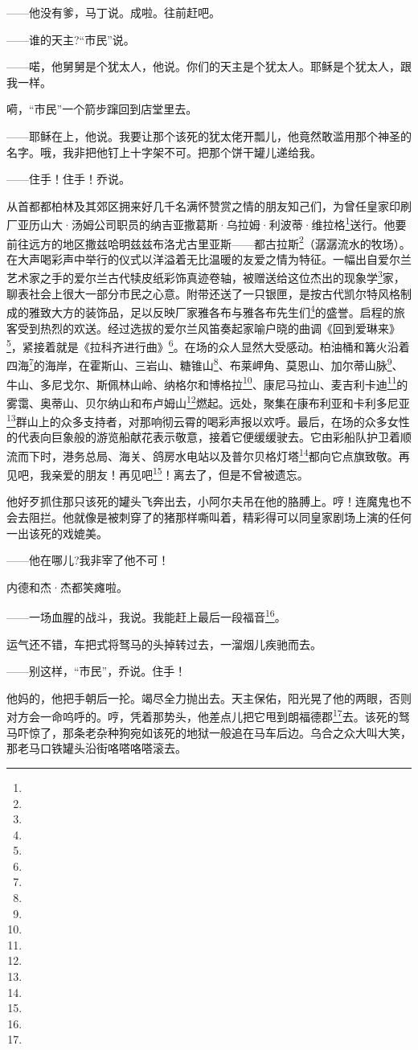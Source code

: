 \par ——他没有爹，马丁说。成啦。往前赶吧。
\par ——谁的天主?“市民”说。
\par ——喏，他舅舅是个犹太人，他说。你们的天主是个犹太人。耶稣是个犹太人，跟我一样。
\par 嗬，“市民”一个箭步蹿回到店堂里去。
\par ——耶稣在上，他说。我要让那个该死的犹太佬开瓢儿，他竟然敢滥用那个神圣的名字。哦，我非把他钉上十字架不可。把那个饼干罐儿递给我。
\par ——住手！住手！乔说。
\par 从首都都柏林及其郊区拥来好几千名满怀赞赏之情的朋友知己们，为曾任皇家印刷厂亚历山大·汤姆公司职员的纳吉亚撒葛斯·乌拉姆·利波蒂·维拉格\footnote{}送行。他要前往远方的地区撒兹哈明兹兹布洛尤古里亚斯——都古拉斯\footnote{}（潺潺流水的牧场）。在大声喝彩声中举行的仪式以洋溢着无比温暖的友爱之情为特征。一幅出自爱尔兰艺术家之手的爱尔兰古代犊皮纸彩饰真迹卷轴，被赠送给这位杰出的现象学\footnote{}家，聊表社会上很大一部分市民之心意。附带还送了一只银匣，是按古代凯尔特风格制成的雅致大方的装饰品，足以反映厂家雅各布与雅各布先生们\footnote{}的盛誉。启程的旅客受到热烈的欢送。经过选拔的爱尔兰风笛奏起家喻户晓的曲调《回到爱琳来》\footnote{}，紧接着就是《拉科齐进行曲》\footnote{}。在场的众人显然大受感动。柏油桶和篝火沿着四海\footnote{}的海岸，在霍斯山、三岩山、糖锥山\footnote{}、布莱岬角、莫恩山、加尔蒂山脉\footnote{}、牛山、多尼戈尔、斯佩林山岭、纳格尔和博格拉\footnote{}、康尼马拉山、麦吉利卡迪\footnote{}的雾霭、奥蒂山、贝尔纳山和布卢姆山\footnote{}燃起。远处，聚集在康布利亚和卡利多尼亚\footnote{}群山上的众多支持者，对那响彻云霄的喝彩声报以欢呼。最后，在场的众多女性的代表向巨象般的游览船献花表示敬意，接着它便缓缓驶去。它由彩船队护卫着顺流而下时，港务总局、海关、鸽房水电站以及普尔贝格灯塔\footnote{}都向它点旗致敬。再见吧，我亲爱的朋友！再见吧\footnote{}！离去了，但是不曾被遗忘。
\par 他好歹抓住那只该死的罐头飞奔出去，小阿尔夫吊在他的胳膊上。哼！连魔鬼也不会去阻拦。他就像是被刺穿了的猪那样嘶叫着，精彩得可以同皇家剧场上演的任何一出该死的戏媲美。
\par ——他在哪儿?我非宰了他不可！
\par 内德和杰·杰都笑瘫啦。
\par ——一场血腥的战斗，我说。我能赶上最后一段福音\footnote{}。
\par 运气还不错，车把式将驽马的头掉转过去，一溜烟儿疾驰而去。
\par ——别这样，“市民”，乔说。住手！
\par 他妈的，他把手朝后一抡。竭尽全力抛出去。天主保佑，阳光晃了他的两眼，否则对方会一命呜呼的。哼，凭着那势头，他差点儿把它甩到朗福德郡\footnote{}去。该死的驽马吓惊了，那条老杂种狗宛如该死的地狱一般追在马车后边。乌合之众大叫大笑，那老马口铁罐头沿街咯嗒咯嗒滚去。
